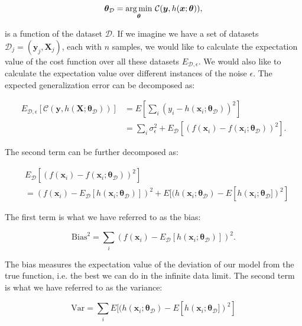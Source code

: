 \begin{equation}
 \bm{\theta}_{\mathcal{D}} = \underset{\bm{\theta}}{\operatorname*{arg\,min}} \
\mathcal{C}(\bm{y}, h(\bm{x}; \bm{\theta})) ,
\end{equation}

is a function of the dataset $\mathcal{D}$. If we imagine we have a set of
datasets $\mathcal{D}_j = (\bm{y}_j, \bm{X}_j)$, each with $n$ samples, we would like to calculate
the expectation value of the cost function over all these datasets $E_{\mathcal{D}, \epsilon}$.
We would also like to calculate the expectation value over different instances of the noise $\epsilon$.
The expected generalization error can be decomposed as:

\begin{equation}
\begin{split}
    E_{\mathcal{D}, \epsilon} [\mathcal{C}(\bm{y}, h(\bm{X} ; \bm{\theta}_{\mathcal{D}}))]
    &= E \left[ \sum_i (y_i - h(\bm{x}_i ; \bm{\theta}_{\mathcal{D}}))^2 \right] \\
    &= \sum_i \sigma_{\epsilon}^2 + E_{\mathcal{D}}[(f(\bm{x}_i) - f(\bm{x}_i ; \bm{\theta}_{\mathcal{D}}))^2] .
\end{split}
\end{equation}

The second term can be further decomposed as:

\begin{equation}
\begin{split}
    &E_{\mathcal{D}}[(f(\bm{x}_i) - f(\bm{x}_i ; \bm{\theta}_{\mathcal{D}}))^2] \\
    &= (f(\bm{x}_i) - E_{\mathcal{D}}[h(\bm{x}_i ; \bm{\theta}_{\mathcal{D}})])^2
    + E[(h(\bm{x}_i ; \bm{\theta}_{\mathcal{D}}) - E[h(\bm{x}_i ; \bm{\theta}_{\mathcal{D}}])^2]
\end{split}
\end{equation}

The first term is what we have referred to as the bias:

\begin{equation}
    \text{Bias}^2 = \sum_i (f(\bm{x}_i) - E_{\mathcal{D}}[h(\bm{x}_i ; \bm{\theta}_{\mathcal{D}})])^2.
\end{equation}

The bias measures the expectation value of the deviation of our model from the true
function, i.e. the best we can do in the infinite data limit.
The second term is what we have referred to as the variance:

\begin{equation}
    \text{Var} = \sum_i  E[(h(\bm{x}_i ; \bm{\theta}_{\mathcal{D}}) - E[h(\bm{x}_i ; \bm{\theta}_{\mathcal{D}}])^2]
\end{equation}

